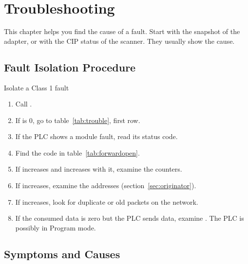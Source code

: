 \chapter{Troubleshooting}\label{ch:trouble}

This chapter helps you find the cause of a fault. Start with the snapshot of
the adapter, or with the CIP status of the scanner. They usually show the
cause.

\section{Fault Isolation Procedure}

\begin{procedure}{Isolate a Class 1 fault}
\begin{enumerate}
  \item Call .
  \item If  is 0, go to table~\ref{tab:trouble}, first row.
  \item If the PLC shows a module fault, read its status code.
  \item Find the code in table~\ref{tab:forwardopen}.
  \item If  increases and  increases with it,
        examine the  counters.
  \item If  increases, examine the addresses
        (section~\ref{sec:originator}).
  \item If  increases, look for duplicate or old
        packets on the network.
  \item If the consumed data is zero but the PLC sends data, examine
        . The PLC is possibly in Program mode.
\end{enumerate}
\end{procedure}

\section{Symptoms and Causes}


